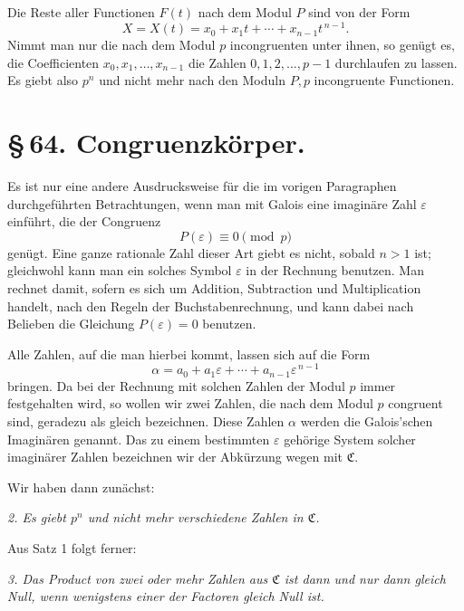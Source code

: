 \documentclass[11pt]{article}
\begin{document}
Die Reste aller Functionen $F(t)$ nach dem Modul $P$ sind von der Form
\begin{equation}
 X=X(t)=x_0+x_1t+\cdots+x_{n-1}t^{\,n-1}. \tag{7}
\end{equation}
Nimmt man nur die nach dem Modul $p$ incongruenten unter ihnen, so genügt es, die Coefficienten $x_0,x_1,\ldots,x_{n-1}$ die Zahlen $0,1,2,\ldots,p-1$ durchlaufen zu lassen. Es giebt also $p^n$ und nicht mehr nach den Moduln $P,p$ incongruente Functionen.

\section*{\S\,64. Congruenzkörper.}

Es ist nur eine andere Ausdrucksweise für die im vorigen Paragraphen durchgeführten Betrachtungen, wenn man mit Galois eine imaginäre Zahl $\varepsilon$ einführt, die der Congruenz
\begin{equation}
 P(\varepsilon)\equiv0\pmod p \tag{1}
\end{equation}
genügt. Eine ganze rationale Zahl dieser Art giebt es nicht, sobald $n>1$ ist; gleichwohl kann man ein solches Symbol $\varepsilon$ in der Rechnung benutzen. Man rechnet damit, sofern es sich um Addition, Subtraction und Multiplication handelt, nach den Regeln der Buchstabenrechnung, und kann dabei nach Belieben die Gleichung $P(\varepsilon)=0$ benutzen.

Alle Zahlen, auf die man hierbei kommt, lassen sich auf die Form
\begin{equation}
 \alpha=a_0+a_1\varepsilon+\cdots+a_{n-1}\varepsilon^{\,n-1} \tag{2}
\end{equation}
bringen. Da bei der Rechnung mit solchen Zahlen der Modul $p$ immer festgehalten wird, so wollen wir zwei Zahlen, die nach dem Modul $p$ congruent sind, geradezu als gleich bezeichnen. Diese Zahlen $\alpha$ werden die Galois'schen Imaginären genannt. Das zu einem bestimmten $\varepsilon$ gehörige System solcher imaginärer Zahlen bezeichnen wir der Abkürzung wegen mit $\mathfrak C$.

Wir haben dann zunächst:

\emph{2. Es giebt $p^n$ und nicht mehr verschiedene Zahlen in $\mathfrak C$.}

Aus Satz 1 folgt ferner:

\emph{3. Das Product von zwei oder mehr Zahlen aus $\mathfrak C$ ist dann und nur dann gleich Null, wenn wenigstens einer der Factoren gleich Null ist.}
\end{document}

